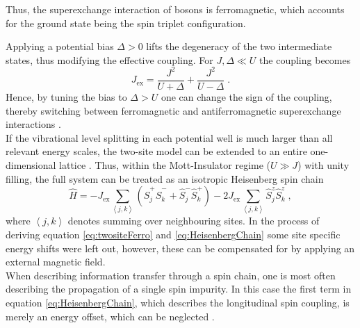 Thus, the superexchange interaction of bosons is ferromagnetic, which accounts for the ground state being the spin triplet configuration.

Applying a potential bias $\Delta > 0$ lifts the degeneracy of the two intermediate states, thus modifying the effective coupling. For $J,\Delta \ll U$ the coupling becomes
\begin{equation}
	J_{\mathrm{ex}} = \frac{J^2}{U + \Delta} + \frac{J^2}{U - \Delta} \; . \label{eq:Jex_delta}
\end{equation}
Hence, by tuning the bias to $\Delta > U$ one can change the sign of the coupling, thereby switching between ferromagnetic and antiferromagnetic superexchange interactions \cite{Trotzky2008}.\\
If the vibrational level splitting in each potential well is much larger than all relevant energy scales, the two-site model can be extended to an entire one-dimensional lattice \cite{Trotzky2008}. Thus, within the Mott-Insulator regime ($U \gg J$) with unity filling, the full system can be treated as an isotropic Heisenberg spin chain
\begin{equation}
	\hat{H} = - J_{\mathrm{ex}} \sum_{\left\langle j, k \right\rangle} \left( \hat{S}_{j}^{+} \hat{S}_{k}^{-} + \hat{S}_{j}^{-} \hat{S}_{k}^{+} \right) - 2 J_{\mathrm{ex}} \sum_{\left\langle j, k \right\rangle} \hat{S}_{j}^{z} \hat{S}_{k}^{z} \; , \label{eq:HeisenbergChain}
\end{equation}
where $\left\langle j, k \right\rangle$ denotes summing over neighbouring sites. In the process of deriving equation \eqref{eq:twositeFerro} and \eqref{eq:HeisenbergChain} some site specific energy shifts were left out, however, these can be compensated for by applying an external magnetic field.\\
When describing information transfer through a spin chain, one is most often describing the propagation of a single spin impurity. In this case the first term in equation \ref{eq:HeisenbergChain}, which describes the longitudinal spin coupling, is merely an energy offset, which can be neglected \cite{Fukuhara2013}.  